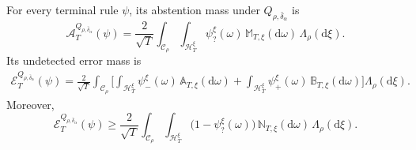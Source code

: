 \documentclass[10pt]{article}
\newcommand{\dd}{\mathrm{d}}
\theoremstyle{plain}
\begin{document}
\begin{lemma}
\label{lem:flat-sign-risk-representation-transfer-lower}
For every terminal rule $\psi$, its abstention mass
under $Q_{\rho,\bar\delta_\alpha}$ is
\begin{equation}
\label{eq:flat-sign-abstention-transfer-lower}
    \mathcal A_T^{Q_{\rho,\bar\delta_\alpha}}(\psi)
    =
    \frac{2}{\sqrt T}
    \int_{\mathcal C_\rho}
    \int_{\mathcal H_T^\xi}
        \psi_?^\xi(\omega)
    \,\mathbb M_{T,\xi}(\dd\omega)\,
    \Lambda_\rho(\dd\xi).
\end{equation}
Its undetected error mass is
\begin{equation}
\label{eq:flat-sign-error-transfer-lower}
\begin{aligned}
    \mathcal E_T^{Q_{\rho,\bar\delta_\alpha}}(\psi)
    =
    \frac{2}{\sqrt T}
    \int_{\mathcal C_\rho}
    \bigg[
        \int_{\mathcal H_T^\xi}
            \psi_-^\xi(\omega)
        \,\mathbb A_{T,\xi}(\dd\omega)
        +
        \int_{\mathcal H_T^\xi}
            \psi_+^\xi(\omega)
        \,\mathbb B_{T,\xi}(\dd\omega)
    \bigg]
    \Lambda_\rho(\dd\xi).
\end{aligned}
\end{equation}
Moreover,
\begin{equation}
\label{eq:flat-sign-overlap-lower-transfer-lower}
    \mathcal E_T^{Q_{\rho,\bar\delta_\alpha}}(\psi)
    \ge
    \frac{2}{\sqrt T}
    \int_{\mathcal C_\rho}
    \int_{\mathcal H_T^\xi}
        \bigl(1-\psi_?^\xi(\omega)\bigr)
    \,\mathbb N_{T,\xi}(\dd\omega)\,
    \Lambda_\rho(\dd\xi).
\end{equation}
\end{lemma}
\end{document}
